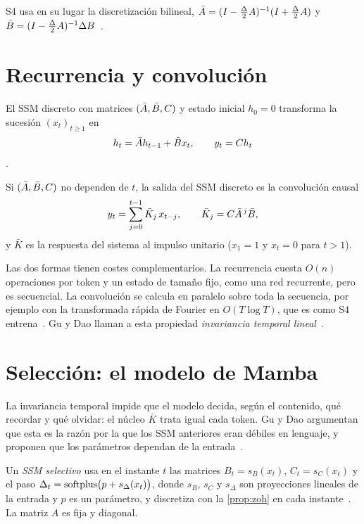 S4 usa en su lugar la discretización bilineal, $\bar{A}=(I-\frac\Delta2A)^{-1}(I+\frac\Delta2A)$ y $\bar{B}=(I-\frac\Delta2A)^{-1}\Delta B$~\cite[§2.3]{s4}.

\addtocounter{definicion}{1}%

\section{Recurrencia y convolución}

\begin{definicion}\label{def:ssmdiscreto}
El SSM discreto con matrices $(\bar{A},\bar{B},C)$ y estado inicial $h_0=0$ transforma la sucesión $(x_t)_{t\ge1}$ en
\[
h_t=\bar{A} h_{t-1}+\bar{B} x_t,\qquad y_t=Ch_t
\]
\cite[ecs.~2a y~2b]{mamba}.
\end{definicion}

\begin{proposicion}\label{prop:conv}
Si $(\bar{A},\bar{B},C)$ no dependen de $t$, la salida del SSM discreto es la convolución causal
\[
y_t=\sum_{j=0}^{t-1}\bar K_j\,x_{t-j},\qquad \bar K_j=C\bar{A}^{\,j}\bar{B},
\]
y $\bar K$ es la respuesta del sistema al impulso unitario ($x_1=1$ y $x_t=0$ para $t>1$).
\end{proposicion}

\addtocounter{definicion}{1}%

Las dos formas tienen costes complementarios. La recurrencia cuesta $O(n)$ operaciones por token y un estado de tamaño fijo, como una red recurrente, pero es secuencial. La convolución se calcula en paralelo sobre toda la secuencia, por ejemplo con la transformada rápida de Fourier en $O(T\log T)$, que es como S4 entrena~\cite[§2.4]{s4}. Gu y Dao llaman a esta propiedad \emph{invariancia temporal lineal}~\cite[§2]{mamba}.

\section{Selección: el modelo de Mamba}

La invariancia temporal impide que el modelo decida, según el contenido, qué recordar y qué olvidar: el núcleo $\bar K$ trata igual cada token. Gu y Dao argumentan que esta es la razón por la que los SSM anteriores eran débiles en lenguaje, y proponen que los parámetros dependan de la entrada~\cite[§3.1 y §3.2]{mamba}.

\begin{definicion}\label{def:selectivo}
Un \emph{SSM selectivo} usa en el instante $t$ las matrices $B_t=s_B(x_t)$, $C_t=s_C(x_t)$ y el paso $\Delta_t=\operatorname{softplus}\bigl(p+s_\Delta(x_t)\bigr)$, donde $s_B$, $s_C$ y $s_\Delta$ son proyecciones lineales de la entrada y $p$ es un parámetro, y discretiza con la \cref{prop:zoh} en cada instante~\cite[§3.2, algoritmo~2]{mamba}. La matriz $A$ es fija y diagonal.
\end{definicion}

